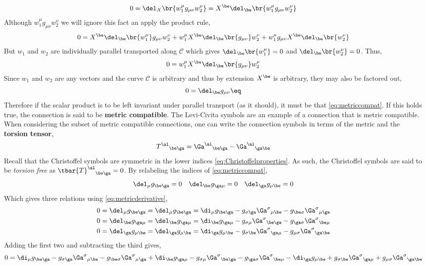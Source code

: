 \documentclass{article}
\begin{document}
\[ 0 = \del_X \br{w_1^\mu g_{\mu\nu} w_2^\nu} = X^\be \del_\be\br{w_1^\mu g_{\mu\nu} w_2^\nu}  \]
Although $w_1^\mu g_{\mu\nu} w_2^\nu$ we will ignore this fact an apply the product rule,
\[ 0 = X^\be \del_\be\br{w_1^\mu} g_{\mu\nu} w_2^\nu + w_1^\mu X^\be \del_\be\br{g_{\mu\nu}} w_2^\nu + w_1^\mu g_{\mu\nu} X^\be \del_\be\br{w_2^\nu} \]
But $w_1$ and $w_2$ are individually parallel transported along $\mathcal{C}$ which gives $\del_\be\br{w_1^\mu} = 0$ and $\del_\be\br{w_2^\nu} = 0$. Thus,
\[ 0 = w_1^\mu X^\be \del_\be\br{g_{\mu\nu}} w_2^\nu \]
Since $w_1$ and $w_2$ are any vectors and the curve $\mathcal{C}$ is arbitrary and thus by extension $X^\be$ is arbitrary, they may also be factored out,
\[ 0 = \del_\be g_{\mu\nu} \eq \label{eq:metriccompat} \]
Therefore if the scalar product is to be left invariant under parallel transport (as it should), it must be that \eqref{eq:metriccompat}. If this holds true, the connection is said to be \textbf{metric compatible}. The Levi-Civita symbols are an example of a connection that is metric compatible.
When considering the subset of metric compatible connections, one can write the connection symbols in terms of the metric and the \textbf{torsion tensor},
\[ {T^\al}_{\be\ga} = {\Ga^\al}_{\be\ga} - {\Ga^\al}_{\ga\be} \]
Recall that the Christoffel symbols are symmetric in the lower indices \eqref{eq:Christoffelproperties}. As such, the Christoffel symbols are said to be \textit{torsion free} as ${\tbar{T}^\al}_{\be\ga} = 0$. By relabeling the indices of \eqref{eq:metriccompat},
\[ \del_\mu g_{\be\ga} = 0 \quad \del_\be g_{\ga\mu} = 0 \quad \del_\ga g_{\mu\be} = 0 \]
Which gives three relations using \eqref{eq:metricderivative},
\begin{align*}
0 &= \del_\mu g_{\be\ga} = \del_\mu g_{\be\ga} = \di_\mu g_{\be\ga} - g_{\sigma\ga} {\Ga^\sigma}_{\mu\be}  - g_{\be\sigma}  {\Ga^\sigma}_{\mu\ga} \\
0 &= \del_\be g_{\ga\mu} = \del_\be g_{\ga\mu} = \di_\be g_{\ga\mu} - g_{\sigma\mu} {\Ga^\sigma}_{\be\ga}  - g_{\ga\sigma}  {\Ga^\sigma}_{\be\mu} \\
0 &= \del_\ga g_{\mu\be} = \del_\ga g_{\mu\be} = \di_\ga g_{\mu\be} - g_{\sigma\be} {\Ga^\sigma}_{\ga\mu}  - g_{\mu\sigma}  {\Ga^\sigma}_{\ga\be}
\end{align*}
Adding the first two and subtracting the third gives,
\[ 0 = \di_\mu g_{\be\ga} - g_{\sigma\ga} {\Ga^\sigma}_{\mu\be}  - g_{\be\sigma}  {\Ga^\sigma}_{\mu\ga} + \di_\be g_{\ga\mu} - g_{\sigma\mu} {\Ga^\sigma}_{\be\ga}  - g_{\ga\sigma}  {\Ga^\sigma}_{\be\mu} - \di_\ga g_{\mu\be} + g_{\sigma\be} {\Ga^\sigma}_{\ga\mu}  + g_{\mu\sigma}  {\Ga^\sigma}_{\ga\be} \]
\end{document}
